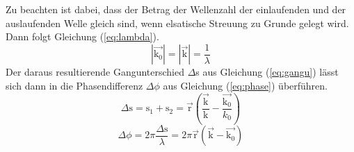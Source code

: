 Zu beachten ist dabei, dass der Betrag der Wellenzahl der einlaufenden und der auslaufenden Welle gleich sind, wenn elsatische Streuung zu Grunde gelegt wird. Dann folgt Gleichung (\ref{eq:lambda}).
\begin{equation}
|\vec{\text{k}_0}| = |\vec{\text{k}}| = \frac{1}{\lambda}
\label{eq:lambda}
\end{equation} 
Der daraus resultierende Gangunterschied $\Delta $s aus Gleichung (\ref{eq:gangu}) lässt sich dann in die Phasendifferenz $\Delta \phi$ aus Gleichung (\ref{eq:phase}) überführen.
\begin{equation}
\Delta \text{s} = \text{s}_1+\text{s}_2 = \vec{\text{r}} \left( \frac{\vec{\text{k}}}{\text{k}} - \frac{\vec{\text{k}_0}}{k_0}  \right)
\label{eq:gangu} 
\end{equation}
\begin{equation}
\Delta \phi = 2\pi\frac{\Delta \text{s}}{\lambda} = 2\pi \vec{\text{r}} (\vec{\text{k}}-\vec{\text{k}_0})
\label{eq:phase} 
\end{equation}

